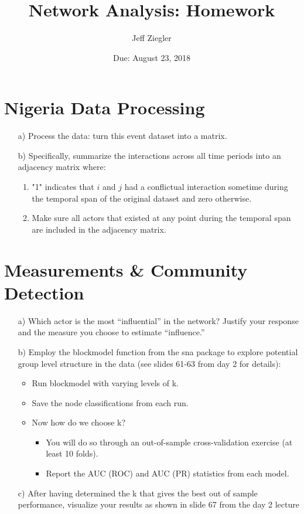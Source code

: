 \documentclass[12pt,letterpaper]{article}
\title{Network Analysis: Homework}
\date{Due: August 23, 2018}
\author{Jeff Ziegler}
\begin{document}
\maketitle

\section{Nigeria Data Processing}

\begin{itemize}
	\item[a)] Process the data: turn this event dataset into a matrix.
	\item[b)] Specifically, summarize the interactions across all time periods into an adjacency matrix where:
	\begin{enumerate}
		\item "1" indicates that $i$ and $j$ had a conflictual interaction sometime during the temporal span of the original dataset and zero otherwise.
		\item Make sure all actors that existed at any point during the temporal span are included in the adjacency matrix.
	\end{enumerate}
\end{itemize}

	  
	
\section{Measurements \& Community Detection}

\begin{itemize}
	\item[a)] Which actor is the most “influential” in the network? Justify your response and the measure you choose to estimate “influence.”
	\item[b)] Employ the blockmodel function from the sna package to explore potential group level structure in the data (see slides 61-63 from day 2 for details):
	\begin{itemize}
		\item Run blockmodel with varying levels of k.
		\item Save the node classifications from each run.
		\item Now how do we choose k?
			\begin{itemize}
				\item You will do so through an out-of-sample cross-validation exercise (at least 10 folds).
				\item Report the AUC (ROC) and AUC (PR) statistics from each model.
			\end{itemize}
	\end{itemize}
	\item [c)] After having determined the k that gives the best out of sample performance, visualize your results as shown in slide 67 from the day 2 lecture
\end{itemize}
\end{document}
